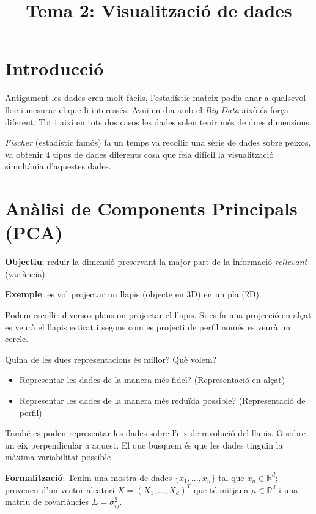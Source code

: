 \documentclass[a4paper]{article}
\begin{document}
	\title{Tema 2: Visualització de dades}
	\maketitle
	
	\section{Introducció}
	
	Antigament les dades eren molt fàcils, l'estadístic mateix podia anar a qualsevol lloc i mesurar el que li interessés. Avui en dia amb el \emph{Big Data} això és força diferent. Tot i així en tots dos casos les dades solen tenir més de dues dimensions. 
	
	\emph{Fischer} (estadístic famós) fa un temps va recollir una sèrie de dades sobre peixos, va obtenir 4 tipus de dades diferents cosa que feia difícil la visualització simultània d'aquestes dades.
	
	\section{Anàlisi de Components Principals (PCA)}
	
	\textbf{Objectiu}: reduir la dimensió preservant la major part de la informació \emph{rellevant} (variància). 
	
	\textbf{Exemple}: es vol projectar un llapis (objecte en 3D) en un pla (2D).
	
	
	
	Podem escollir diversos plans on projectar el llapis. Si es fa una projecció en alçat es veurà el llapis estirat i segons com es projecti de perfil només es veurà un cercle.
	
	Quina de les dues representacions és millor? Què volem? 
	\begin{itemize}
		\item Representar les dades de la manera més fidel? (Representació en alçat)
		\item Representar les dades de la manera més reduïda possible? (Representació de perfil)
	\end{itemize}
	
	També es poden representar les dades sobre l'eix de revolució del llapis. O sobre un eix perpendicular a aquest. El que busquem és que les dades tinguin la màxima variabilitat possible.
	
	\textbf{Formalització}: Tenim una mostra de dades $\{x_1, ..., x_n\}$ tal que $x_n \in \mathbb{R}^d$; provenen d'un vector aleatori $X = (X_1, ..., X_d)^T$ que té mitjana $\mu \in \mathbb{R}^d$ i una matriu de covariàncies $\Sigma = \sigma_{ij}^2$.
	
\end{document}
